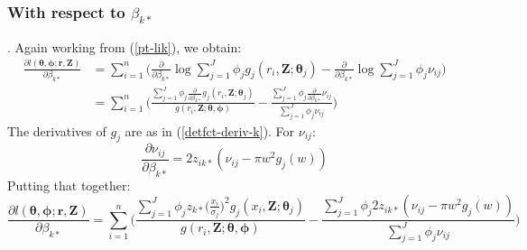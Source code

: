 \documentclass[useAMS,referee, usegraphicx]{biom}
\begin{document}
\subsubsection*{With respect to $\beta_{k*}$}. Again working from (\ref{pt-lik}), we obtain:
\begin{align*}
\frac{\partial l(\bm{\theta}, \bm{\phi}; \mathbf{r},\mathbf{Z})}{\partial \beta_{k*}}  &= \sum_{i=1}^n \Big( \frac{\partial}{\partial \beta_{k*}} \log \sum_{j=1}^J \phi_j g_j(r_i,\mathbf{Z}; \bm{\theta}_j) - \frac{\partial}{\partial \beta_{k*}}\log \sum_{j=1}^J \phi_j \nu_{ij}\Big)\\
&= \sum_{i=1}^n \Big( \frac{ \sum_{j=1}^J \phi_{j} \frac{\partial}{\partial \beta_{k*}}  g_{j} (r_i,\mathbf{Z}; \bm{\theta}_j)}{g(r_i,\mathbf{Z}; \bm{\theta}, \bm{\phi})} - \frac{ \sum_{j=1}^J \phi_{j}\frac{\partial}{\partial \beta_{k*}}  \nu_{ij} }{ \sum_{j=1}^J \phi_j \nu_{ij}}\Big)
\end{align*}
The derivatives of $g_j$ are as in (\ref{detfct-deriv-k}). For $\nu_{ij}$:
\begin{equation*}
\frac{\partial \nu_{ij}}{\partial \beta_{k*}} =  2z_{ik*}(\nu_{ij} - \pi w^2 g_j(w))
\end{equation*}
Putting that together:
\begin{equation*}
\frac{\partial l(\bm{\theta}, \bm{\phi}; \mathbf{r},\mathbf{Z})}{\partial \beta_{k*}}  = \sum_{i=1}^n \Big( \frac{ \sum_{j=1}^J \phi_{j} z_{k*} \Big( \frac{x_i}{\sigma_{j}}\Big)^2 g_j(x_i,\mathbf{Z}; \bm{\theta}_j)}{g(r_i,\mathbf{Z}; \bm{\theta}, \bm{\phi})} - \frac{ \sum_{j=1}^J \phi_{j}2z_{ik*}(\nu_{ij} - \pi w^2 g_j(w)) }{ \sum_{j=1}^J \phi_j \nu_{ij}}\Big)
\end{equation*}

\label{lastpage}
\end{document}
